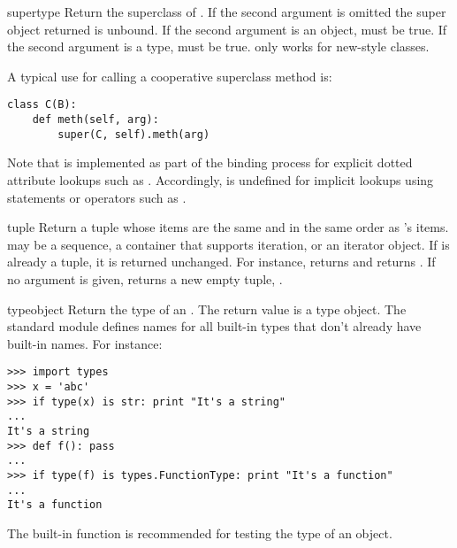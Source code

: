 \begin{funcdesc}{super}{type}
  Return the superclass of .  If the second argument is omitted
  the super object returned is unbound.  If the second argument is an
  object,  must be true.  If
  the second argument is a type,  must be true.
   only works for new-style classes.

  A typical use for calling a cooperative superclass method is:
\begin{verbatim}
class C(B):
    def meth(self, arg):
        super(C, self).meth(arg)
\end{verbatim}

  Note that  is implemented as part of the binding process for
  explicit dotted attribute lookups such as
  .  Accordingly,  is
  undefined for implicit lookups using statements or operators such as
  .
\end{funcdesc}

\begin{funcdesc}{tuple}{}
  Return a tuple whose items are the same and in the same order as
  's items.   may be a sequence, a
  container that supports iteration, or an iterator object.
  If  is already a tuple, it
  is returned unchanged.  For instance,  returns
   and  returns
  .  If no argument is given, returns a new empty
  tuple, \code{()}.
\end{funcdesc}

\begin{funcdesc}{type}{object}
  Return the type of an .  The return value is a
  type object.  The standard module
   defines names for all built-in
  types that don't already have built-in names.
  For instance:

\begin{verbatim}
>>> import types
>>> x = 'abc'
>>> if type(x) is str: print "It's a string"
...
It's a string
>>> def f(): pass
...
>>> if type(f) is types.FunctionType: print "It's a function"
...
It's a function
\end{verbatim}

  The  built-in function is recommended for
  testing the type of an object.
\end{funcdesc}

